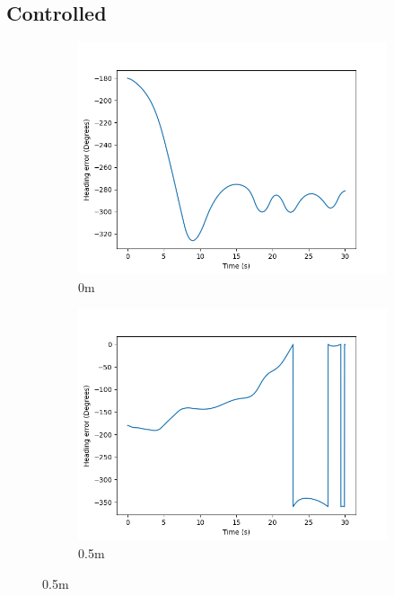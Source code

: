 \documentclass[class=article, crop=false]{standalone}
\begin{document}
\subsection{Controlled}
\begin{figure}
    \centering
    \begin{subfigure}[b]{0.48\textwidth}
        \centering
        \includegraphics{scenario1/rov-0m/0.0m/usv_heading_error_controlled}
        \caption{0m}
        \label{}
    \end{subfigure}
    \hfill
    \begin{subfigure}[b]{0.48\textwidth}
        \centering
        \includegraphics{scenario1/rov-0m/0.5m/usv_heading_error_controlled}
        \caption{0.5m}

\end{subfigure}
\end{figure}
\end{document}
